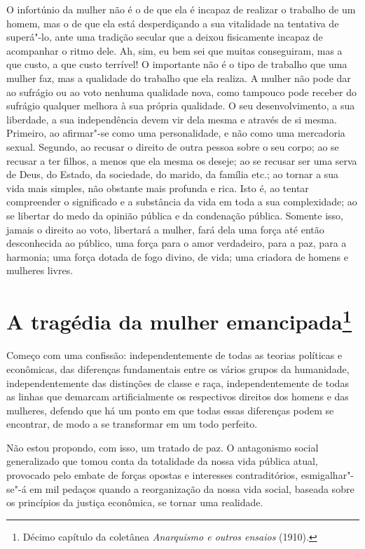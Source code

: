 O infortúnio da mulher não é o de que ela é incapaz de realizar o
trabalho de um homem, mas o de que ela está desperdiçando a sua
vitalidade na tentativa de superá"-lo, ante uma tradição secular que a
deixou fisicamente incapaz de acompanhar o ritmo dele. Ah, sim, eu bem
sei que muitas conseguiram, mas a que custo, a que custo terrível! O
importante não é o tipo de trabalho que uma mulher faz, mas a qualidade
do trabalho que ela realiza. A mulher não pode dar ao sufrágio ou ao
voto nenhuma qualidade nova, como tampouco pode receber do sufrágio
qualquer melhora à sua própria qualidade. O seu desenvolvimento, a sua
liberdade, a sua independência devem vir dela mesma e através de si
mesma. Primeiro, ao afirmar"-se como uma personalidade, e não como uma
mercadoria sexual. Segundo, ao recusar o direito de outra pessoa sobre o
seu corpo; ao se recusar a ter filhos, a menos que ela mesma os deseje;
ao se recusar ser uma serva de Deus, do Estado, da sociedade, do marido,
da família etc.; ao tornar a sua vida mais simples, não obstante mais
profunda e rica. Isto é, ao tentar compreender o significado e a substância
da vida em toda a sua complexidade; ao se libertar do medo da opinião
pública e da condenação pública. Somente isso, jamais o direito ao voto,
libertará a mulher, fará dela uma força até então desconhecida ao
público, uma força para o amor verdadeiro, para a paz, para a harmonia;
uma força dotada de fogo divino, de vida; uma criadora de homens e
mulheres livres.

\chapter{A tragédia da mulher emancipada\footnote[*]{Décimo capítulo da coletânea
  \emph{Anarquismo e outros ensaios} (1910).}}


Começo com uma confissão: independentemente de todas as teorias
políticas e econômicas, das diferenças fundamentais entre os vários
grupos da humanidade, independentemente das distinções de classe e raça,
independentemente de todas as linhas que demarcam artificialmente os
respectivos direitos dos homens e das mulheres, defendo que há um ponto
em que todas essas diferenças podem se encontrar, de modo a se
transformar em um todo perfeito.

Não estou propondo, com isso, um tratado de paz. O antagonismo social
generalizado que tomou conta da totalidade da nossa vida pública atual,
provocado pelo embate de forças opostas e interesses contraditórios,
esmigalhar"-se"-á em mil pedaços quando a reorganização da nossa vida
social, baseada sobre os princípios da justiça econômica, se tornar uma
realidade.

